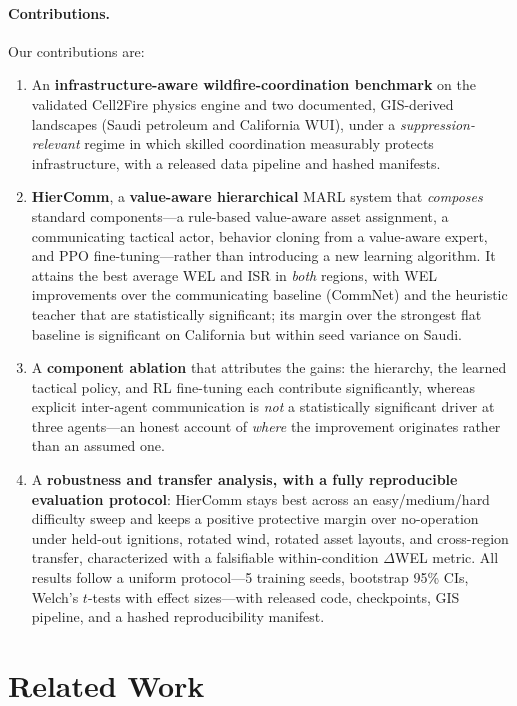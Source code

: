 \documentclass[letterpaper]{article}
\begin{document}
\paragraph{Contributions.} Our contributions are:
\begin{enumerate}
    \item An \textbf{infrastructure-aware wildfire-coordination benchmark} on the validated Cell2Fire physics engine and two documented, GIS-derived landscapes (Saudi petroleum and California WUI), under a \emph{suppression-relevant} regime in which skilled coordination measurably protects infrastructure, with a released data pipeline and hashed manifests.
    \item \textbf{HierComm}, a \textbf{value-aware hierarchical} MARL system that \emph{composes} standard components---a rule-based value-aware asset assignment, a communicating tactical actor, behavior cloning from a value-aware expert, and PPO fine-tuning---rather than introducing a new learning algorithm. It attains the best average WEL and ISR in \emph{both} regions, with WEL improvements over the communicating baseline (CommNet) and the heuristic teacher that are statistically significant; its margin over the strongest flat baseline is significant on California but within seed variance on Saudi.
    \item A \textbf{component ablation} that attributes the gains: the hierarchy, the learned tactical policy, and RL fine-tuning each contribute significantly, whereas explicit inter-agent communication is \emph{not} a statistically significant driver at three agents---an honest account of \emph{where} the improvement originates rather than an assumed one.
    \item A \textbf{robustness and transfer analysis, with a fully reproducible evaluation protocol}: HierComm stays best across an easy/medium/hard difficulty sweep and keeps a positive protective margin over no-operation under held-out ignitions, rotated wind, rotated asset layouts, and cross-region transfer, characterized with a falsifiable within-condition $\Delta$WEL metric. All results follow a uniform protocol---5 training seeds, bootstrap 95\% CIs, Welch's $t$-tests with effect sizes---with released code, checkpoints, GIS pipeline, and a hashed reproducibility manifest.
\end{enumerate}

\section{Related Work}
\label{sec:related}
\end{document}
